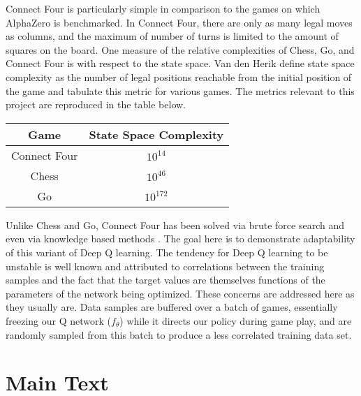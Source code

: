 \documentclass[twoside,11pt]{article}
\begin{document}
Connect Four is particularly simple in comparison to the games on which
AlphaZero is benchmarked. In Connect Four, there are only
as many legal moves as columns, and the maximum of number of turns 
is limited to the amount of squares on the board. 
One measure of the relative complexities of Chess, Go, and Connect Four is with
respect to the state space. Van den Herik \cite{VANDENHERIK2002277}  define state space complexity as the number 
of legal positions reachable from the initial position of the game
and tabulate this metric for various games. The metrics relevant to this project are reproduced in the table
below.

\begin{tabular}{ c c }
        Game & State Space Complexity \\
        \hline
        Connect Four & $10^{14}$ \\
        Chess & $10^{46}$ \\
        Go & $10^{172}$ \\
    \end{tabular}

Unlike Chess and Go, Connect Four has been solved via brute force search \cite{ConnectFourComputer} 
and even via knowledge based methods \cite{ConnectFourKnowledge}. The goal here is to demonstrate
adaptability of this variant of Deep Q learning. The tendency for Deep Q learning to be unstable is 
well known and attributed to correlations between the training samples and the fact that the target 
values are themselves functions of the parameters of the network being optimized. These concerns 
are addressed here as they usually are. Data samples are buffered over a batch of games, essentially 
freezing our Q network ($f_{\theta}$)
while it directs our policy during game play, and are randomly sampled from this batch to produce a
less correlated training data set.


\section{Main Text}
\end{document}
